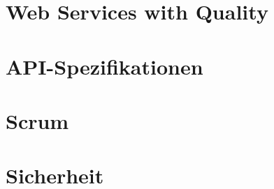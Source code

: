 \section{Web Services with Quality}



\section{API-Spezifikationen}



\section{Scrum}



\section{Sicherheit}